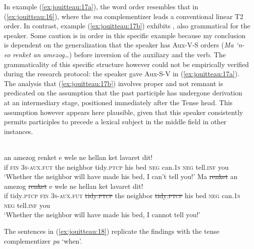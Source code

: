 \documentclass[output=paper,colorlinks,citecolor=brown]{langscibook}
\begin{document}
In example (\ref{ex:jouitteau:17a}), the word order resembles that in (\ref{ex:jouitteau:16}), where the \textit{ma} complementizer leads a conventional linear T2 order. In contrast, example (\ref{ex:jouitteau:17b}) exhibits , also grammatical for the speaker. Some caution is in order in this specific example because my conclusion is  dependent on the generalization that the speaker has Aux-V-S orders (\textit{Ma ‘n-eo renket an amezog…}) before inversion of the auxiliary and the verb. The grammaticality of this specific structure however could not be empirically verified during the research protocol: the speaker gave Aux-S-V in (\ref{ex:jouitteau:17a}). The analysis that (\ref{ex:jouitteau:17b}) involves  proper and not remnant is predicated on the assumption that the past participle has undergone derivation at an intermediary stage, positioned immediately after the Tense head. This assumption however appears here plausible, given that this speaker consistently permits participles to precede a lexical subject in the middle field in other instances. 



\ea \label{ex:jouitteau:17} \\
\ea \label{ex:jouitteau:17a}
    \gll {}   {}     {}            an  amezog     renket      e    wele  ne   hellan   ket  lavaret dit!\\
     if     \textsc{fin} \textsc{3s-aux.fut}  the neighbor tidy\textsc{.ptcp}  his bed    \textsc{neg} can\textsc{.1s} \textsc{neg} tell\textsc{.inf}  you    \\
    \glt `Whether the neighbor will have made his bed, I can’t tell you!’ 
    \ex \label{ex:jouitteau:17b}
    \gll Ma      {}    {}          \sout{renket}     an  amezog       \sout{renket}      e    wele  ne   hellan     ket lavaret dit! \\
    if tidy\textsc{.ptcp} \textsc{fin} \textsc{3s-aux.fut}  \sout{tidy\textsc{.ptcp}} the neighbor \sout{tidy\textsc{.ptcp}} his bed \textsc{neg} can\textsc{.1s} \textsc{neg} tell\textsc{.inf} you \\
    \glt `Whether the neighbor will have made his bed, I cannot tell you!' \\
    \z
    \z 

\noindent The sentences in (\ref{ex:jouitteau:18}) replicate the findings with the tense complementizer \textit{pa} ‘when’. 
\end{document}

